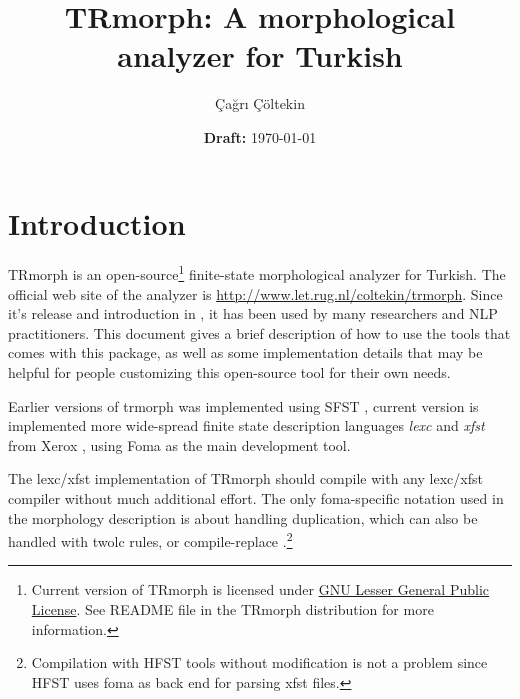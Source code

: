\documentclass[twocolumn]{article}
\title{TRmorph: A morphological analyzer for Turkish}
\author{Çağrı Çöltekin}
\date{\textbf{Draft:} \today}
\begin{document}


\section{Introduction}

TRmorph is an open-source\footnote{Current version of TRmorph is
licensed under \href{http://www.gnu.org/licenses/lgpl.html}{GNU Lesser
General Public License}. See README file in the TRmorph distribution
for more information.} finite-state morphological analyzer for
Turkish. The official web site of the analyzer is
\url{http://www.let.rug.nl/coltekin/trmorph}. Since it's release and
introduction in \cite{coltekin2010}, it has been used by many
researchers and NLP practitioners. This document gives a brief
description of how to use the tools that comes with this package, as
well as some implementation details that may be helpful for people
customizing this open-source tool for their own needs.

Earlier versions of trmorph was implemented using SFST
\parencite{schmid2005}, current version is implemented  more
wide-spread finite state description languages \emph{lexc} and
\emph{xfst} from Xerox \parencite{beesley2003}, using Foma
\parencite{hulden2009} as the main development tool. 

The lexc/xfst implementation of TRmorph should compile with any
lexc/xfst compiler without much additional effort.  The only
foma-specific notation used in the morphology description is about
handling duplication, which can also be handled with twolc rules, or
compile-replace \parencite{beesley2003}.\footnote{Compilation with
HFST tools \parencite{linden2009} without modification is not a
problem since HFST uses foma as back end for parsing xfst files.}
\end{document}
